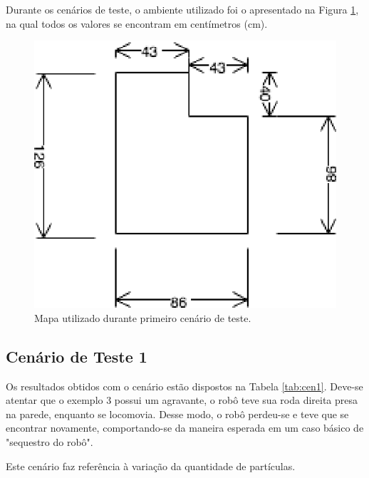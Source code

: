 Durante os cenários de teste, o ambiente utilizado foi o apresentado na Figura \ref{img:map1}, na qual todos os
valores se encontram em centímetros (cm).

\begin{figure}[H]
	\centering
	\includegraphics[scale=1.3]{figuras/map1.eps}
	\caption[Primeiro Cenário de Teste]{Mapa utilizado durante primeiro cenário de teste.}
	\label{img:map1}
\end{figure}

\subsection{Cenário de Teste 1}

Os resultados obtidos com o cenário estão dispostos na Tabela \ref{tab:cen1}. Deve-se atentar que o exemplo 3 possui um agravante, o
robô teve sua roda direita presa na parede, enquanto se locomovia. Desse modo, o robô perdeu-se e teve que se encontrar novamente, comportando-se
da maneira esperada em um caso básico de "sequestro do robô".

Este cenário faz referência à variação da quantidade de partículas.

